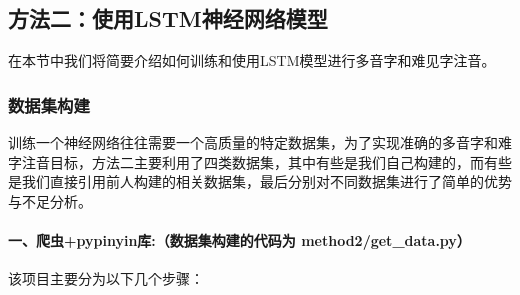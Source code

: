 \documentclass[12pt,hyperref,a4paper,UTF8]{ctexart}
\begin{document}
\subsection{方法二：使用LSTM神经网络模型}
在本节中我们将简要介绍如何训练和使用LSTM模型进行多音字和难见字注音。
\subsubsection{数据集构建}
训练一个神经网络往往需要一个高质量的特定数据集，为了实现准确的多音字和难字注音目标，方法二主要利用了四类数据集，其中有些是我们自己构建的，而有些是我们直接引用前人构建的相关数据集，最后分别对不同数据集进行了简单的优势与不足分析。
\paragraph{一、爬虫+pypinyin库:（数据集构建的代码为 method2/get\_data.py）}%
该项目主要分为以下几个步骤：
\end{document}
